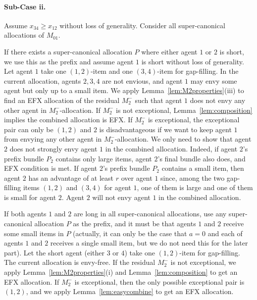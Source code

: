 \documentclass{article}
\theoremstyle{definition}
\begin{document}
\paragraph{Sub-Case ii.}
Assume $x_{34}\ge x_{12}$ without loss of generality.  
Consider all super-canonical allocations of $M_{01}$.

If there exists a super-canonical allocation $P$ where either agent $1$ or $2$ is short, we use this as the prefix and assume agent $1$ is short without loss of generality.
Let agent $1$ take one $(1,2)$-item and one $(3,4)$-item for gap-filling.
In the current allocation, agents $2,3,4$ are not envious, and agent $1$ may envy some agent but only up to a small item.
We apply Lemma~\ref{lem:M2properties}(iii) to find an EFX allocation of the residual $M_2^-$ such that agent $1$ does not envy any other agent in $M_2^-$-allocation.
If $M_2^-$ is not exceptional, Lemma~\ref{lem:composition} implies the combined allocation is EFX.
If $M_2^-$ is exceptional, the exceptional pair can only be $(1,2)$ and $2$ is disadvantageous if we want to keep agent $1$ from envying any other agent in $M_2^-$-allocation.
We only need to show that agent $2$ does not strongly envy agent $1$ in the combined allocation.
Indeed, if agent $2$'s prefix bundle $P_2$ contains only large items, agent $2$'s final bundle also does, and EFX condition is met.
If agent $2$'s prefix bundle $P_2$ contains a small item, then agent $2$ has an advantage of at least $r$ over agent $1$ since, among the two gap-filling items $(1,2)$ and $(3,4)$ for agent $1$, one of them is large and one of them is small for agent $2$.
Agent $2$ will not envy agent $1$ in the combined allocation.

If both agents $1$ and $2$ are long in all super-canonical allocations, use any super-canonical allocation $P$ as the prefix, and it must be that agents $1$ and $2$ receive some small items in $P$ (actually, it can only be the case that $a=0$ and each of agents $1$ and $2$ receives a single small item, but we do not need this for the later part).
Let the short agent (either $3$ or $4$) take one $(1,2)$-item for gap-filling.
The current allocation is envy-free.
If the residual $M_2^-$ is not exceptional, we apply Lemma~\ref{lem:M2properties}(i) and Lemma~\ref{lem:composition} to get an EFX allocation.
If $M_2^-$ is exceptional, then the only possible exceptional pair is $(1,2)$, and we apply Lemma~\ref{lem:easycombine} to get an EFX allocation.
\end{document}
